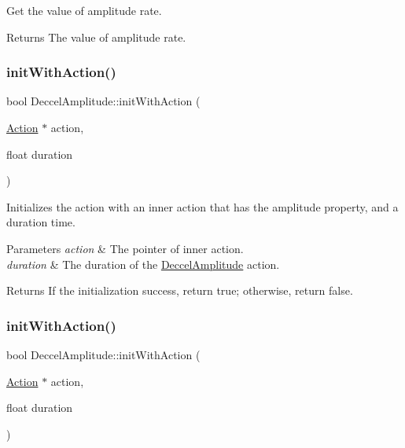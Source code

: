 Get the value of amplitude rate. 

\begin{DoxyReturn}{Returns}
The value of amplitude rate. 
\end{DoxyReturn}
\mbox{\label{classDeccelAmplitude_ac0f006d31810192002d96826dc88a85b}} 
\subsubsection{\texorpdfstring{init\+With\+Action()}{initWithAction()}\hspace{0.1cm}{\footnotesize\ttfamily [1/2]}}
{\footnotesize\ttfamily bool Deccel\+Amplitude\+::init\+With\+Action (\begin{DoxyParamCaption}\item[{\hyperlink{classAction}{Action} $\ast$}]{action,  }\item[{float}]{duration }\end{DoxyParamCaption})}



Initializes the action with an inner action that has the amplitude property, and a duration time. 


\begin{DoxyParams}{Parameters}
{\em action} & The pointer of inner action. \\
\hline
{\em duration} & The duration of the \hyperlink{classDeccelAmplitude}{Deccel\+Amplitude} action. \\
\hline
\end{DoxyParams}
\begin{DoxyReturn}{Returns}
If the initialization success, return true; otherwise, return false. 
\end{DoxyReturn}
\mbox{\label{classDeccelAmplitude_ac0f006d31810192002d96826dc88a85b}} 
\subsubsection{\texorpdfstring{init\+With\+Action()}{initWithAction()}\hspace{0.1cm}{\footnotesize\ttfamily [2/2]}}
{\footnotesize\ttfamily bool Deccel\+Amplitude\+::init\+With\+Action (\begin{DoxyParamCaption}\item[{\hyperlink{classAction}{Action} $\ast$}]{action,  }\item[{float}]{duration }\end{DoxyParamCaption})}



